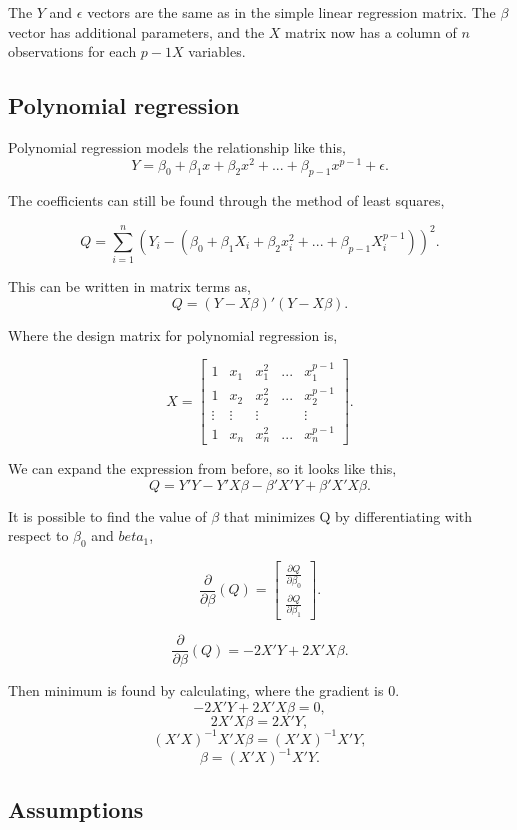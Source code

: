 \noindent The $Y$ and $\epsilon$ vectors are the same as in the simple linear regression matrix. The $\beta$ vector has additional parameters, and the $X$ matrix now has a column of $n$ observations for each $p-1 X$ variables. 

\subsection{Polynomial regression}
Polynomial regression models the relationship like this, 
$$Y=\beta_0 + \beta_1 x + \beta_2 x^2	+ ... + \beta_{p-1} x^{p-1}+ \epsilon .$$

\noindent The coefficients can still be found through the method of least squares,

$$Q=\sum_{i=1}^{n}(Y_i -(\beta_0 + \beta_1 X_i + \beta_2 x_i^2 + ... + \beta_{p-1}X_{i}^{p-1}))^2 .$$
\newline

\noindent This can be written in matrix terms as,
$$Q=(Y-X\beta)' (Y-X\beta) .$$

\noindent Where the design matrix for polynomial regression is, 

$$ X=
\left[
\begin{array}{ccccc}
	1&x_1&x_1^2&...&x_1^{p-1}\\ 
	1&x_2&x_2^2&...&x_2^{p-1} \\
	\vdots & \vdots &\vdots &&\vdots\\
	1&x_n&x_n^2&...&x_n^{p-1} 
\end{array}
\right].
$$

\noindent We can expand the expression from before, so it looks like this,
$$Q=Y' Y -Y' X \beta -\beta' X' Y + \beta' X' X \beta .$$


\noindent It is possible to find the value of $\beta$ that minimizes Q by differentiating with respect to $\beta_0$ and $beta_1$,

$$
\frac{\partial}{\partial \beta}(Q)=
\left[
\begin{array}{c}
	\frac{\partial Q}{\partial \beta_0}\\ 
	\frac{\partial Q}{\partial \beta_1}
\end{array}
\right].
$$

$$
\frac{\partial}{\partial \beta}(Q)=-2 X' Y + 2X' X \beta .$$

\noindent Then minimum is found by calculating, where the gradient is 0.
$$-2 X' Y+ 2X' X \beta =0,$$
$$ 2X' X \beta = 2X' Y,$$
$$(X' X)^{-1} X' X \beta = (X' X)^{-1} X' Y,$$
$$ \beta=(X' X)^{-1} X' Y.$$

	\subsection{Assumptions}
	